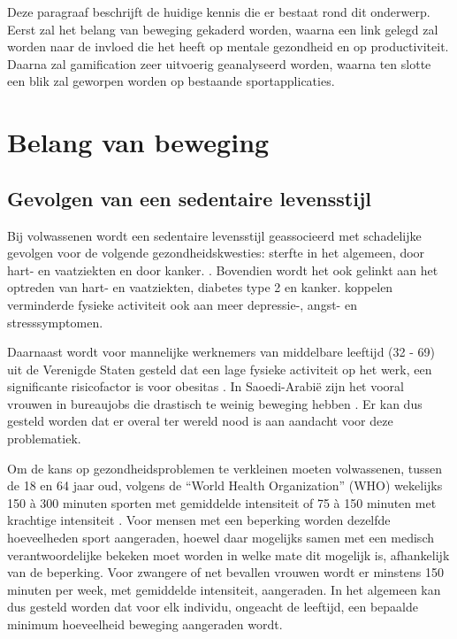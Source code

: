 Deze paragraaf beschrijft de huidige kennis die er bestaat rond dit onderwerp. Eerst zal het belang van beweging gekaderd worden, waarna een link gelegd zal worden naar de invloed die het heeft op mentale gezondheid en op productiviteit. Daarna zal gamification zeer uitvoerig geanalyseerd worden, waarna ten slotte een blik zal geworpen worden op bestaande sportapplicaties.

\section{Belang van beweging}

\subsection{Gevolgen van een sedentaire levensstijl}
Bij volwassenen wordt een sedentaire levensstijl geassocieerd met schadelijke gevolgen voor de volgende gezondheidskwesties: sterfte in het algemeen, door hart- en vaatziekten en door kanker. \autocite{Bull2020}. Bovendien wordt het ook gelinkt aan het optreden van hart- en vaatziekten, diabetes type 2 en kanker. \textcite{Stanton2020} koppelen verminderde fysieke activiteit ook aan meer depressie-, angst- en stresssymptomen.

Daarnaast wordt voor mannelijke werknemers van middelbare leeftijd (32 - 69) uit de Verenigde Staten gesteld dat een lage fysieke activiteit op het werk, een significante risicofactor is voor obesitas \autocite{Choi2010}. In Saoedi-Arabië zijn het vooral vrouwen in bureaujobs die drastisch te weinig beweging hebben \autocite{Albawardi2017}. Er kan dus gesteld worden dat er overal ter wereld nood is aan aandacht voor deze problematiek.

Om de kans op gezondheidsproblemen te verkleinen moeten volwassenen, tussen de 18 en 64 jaar oud, volgens de ``World Health Organization'' (WHO) wekelijks 150 à 300 minuten sporten met gemiddelde intensiteit of 75 à 150 minuten met krachtige intensiteit \autocite{Bull2020}. Voor mensen met een beperking worden dezelfde hoeveelheden sport aangeraden, hoewel daar mogelijks samen met een medisch verantwoordelijke bekeken moet worden in welke mate dit mogelijk is, afhankelijk van de beperking. Voor zwangere of net bevallen vrouwen wordt er minstens 150 minuten per week, met gemiddelde intensiteit, aangeraden. In het algemeen kan dus gesteld worden dat voor elk individu, ongeacht de leeftijd, een bepaalde minimum hoeveelheid beweging aangeraden wordt.

